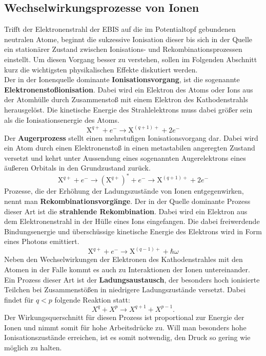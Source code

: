 	\subsection{Wechselwirkungsprozesse von Ionen} \label{sec:ww}
		Trifft der Elektronenstrahl der EBIS auf die im Potentialtopf gebundenen neutralen Atome, beginnt die sukzessive Ionisation dieser bis sich in der Quelle ein stationärer Zustand zwischen Ionisations- und Rekombinationsprozessen einstellt. Um diesen Vorgang besser zu verstehen, sollen im Folgenden Abschnitt kurz die wichtigsten physikalischen Effekte diskutiert werden.\\
		Der in der Ionenquelle dominante \textbf{Ionisationsvorgang}, ist die sogenannte \textbf{Elektronenstoßionisation}. Dabei wird ein Elektron des Atoms oder Ions aus der Atomhülle durch Zusammenstoß mit einem Elektron des Kathodenstrahls herausgelöst. Die kinetische Energie des Strahlelektrons muss dabei größer sein als die Ionisationsenergie des Atoms.
		\begin{equation}
			\text{X}^{q+} + e^{-} \rightarrow \text{X}^{(q+1)+} + 2e^{-}
		\end{equation}
		Der \textbf{Augerprozess} stellt einen mehrstufigen Ionisationsvorgang dar. Dabei wird ein Atom durch einen Elektronenstoß in einen metastabilen angeregten Zustand versetzt und kehrt unter Aussendung eines sogenannten Augerelektrons eines äußeren Orbitals in den Grundzustand zurück.
		\begin{equation}
					\text{X}^{q+} + e^{-} \rightarrow (\text{X}^{q+})^* + e^{-} \rightarrow \text{X}^{(q+1)+} + 2e^{-}
		\end{equation}
		Prozesse, die der Erhöhung der Ladungszustände von Ionen entgegenwirken, nennt man \textbf{Rekombinationsvorgänge}. Der in der Quelle dominante Prozess dieser Art ist die \textbf{strahlende Rekombination}. Dabei wird ein Elektron aus dem Elektronenstrahl in der Hülle eines Ions eingefangen. Die dabei freiwerdende Bindungsenergie und überschüssige kinetische Energie des Elektrons wird in Form eines Photons emittiert.
		\begin{equation}
			\text{X}^{q+} + e^{-} \rightarrow \text{X}^{(q-1)+} + \hbar\omega
		\end{equation}
		Neben den Wechselwirkungen der Elektronen des Kathodenstrahles mit den Atomen in der Falle kommt es auch zu Interaktionen der Ionen untereinander. Ein Prozess dieser Art ist der \textbf{Ladungsaustausch}, der besonders hoch ionisierte Teilchen bei Zusammenstößen in niedrigere Ladungszustände versetzt. Dabei findet für $q<p$ folgende Reaktion statt:
		\begin{equation}
			X^{q} + X^{p} \rightarrow X^{q+1} + X^{p-1}.
		\end{equation}
		Der Wirkungsquerschnitt für diesen Prozess ist proportional zur Energie der Ionen und nimmt somit für hohe Arbeitsdrücke zu. Will man besonders hohe Ionisationszustände erreichen, ist es somit notwendig, den Druck so gering wie möglich zu halten.\cite{PA}
		